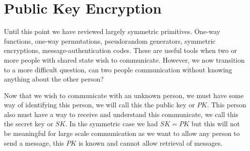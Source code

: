 \documentclass{article}
\begin{document}
\section{Public Key Encryption}
Until this point we have reviewed largely symmetric primitives.  One-way functions, one-way permutations, pseudorandom generators, symmetric encryptions, message-authentication codes.  These are useful tools when two or more people with shared state wish to communicate.  However, we now transition to a more difficult question, can two people communication without knowing anything about the other person?

Now that we wish to communicate with an unknown person, we must have some way of identifying this person, we will call this the public key or $PK$.  This person also must have a way to receive and understand this communicate, we call this the secret key or $SK$.  In the symmetric case we had $SK=PK$ but this will not be meaningful for large scale communication as we want to allow any person to send a message, this $PK$ is known and cannot allow retrieval of messages.
\end{document}
